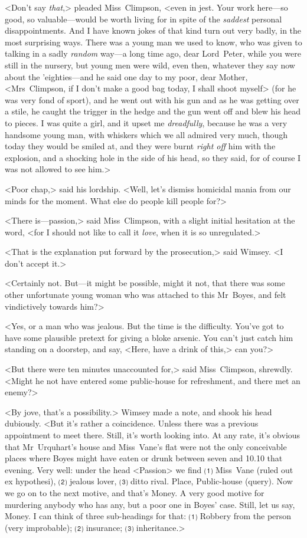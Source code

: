 <Don't say \emph{that},> pleaded Miss~Climpson, <even in jest. Your work here—so good, so valuable—would be worth living for in spite of the \emph{saddest} personal disappointments. And I have known jokes of that kind turn out very badly, in the most surprising ways. There was a young man we used to know, who was given to talking in a sadly \emph{random} way—a long time ago, dear Lord~Peter, while you were still in the nursery, but young men were wild, even then, whatever they say now about the 'eighties—and he said one day to my poor, dear Mother, <Mrs~Climpson, if I don't make a good bag today, I shall shoot myself> (for he was very fond of sport), and he went out with his gun and as he was getting over a stile, he caught the trigger in the hedge and the gun went off and blew his head to pieces. I was quite a girl, and it upset me \emph{dreadfully}, because he was a very handsome young man, with whiskers which we all admired very much, though today they would be smiled at, and they were burnt \emph{right off} him with the explosion, and a shocking hole in the side of his head, so they said, for of course I was not allowed to see him.>

<Poor chap,> said his lordship. <Well, let's dismiss homicidal mania from our minds for the moment. What else do people kill people for?>

<There is—passion,> said Miss~Climpson, with a slight initial hesitation at the word, <for I should not like to call it \emph{love}, when it is so unregulated.>

<That is the explanation put forward by the prosecution,> said Wimsey. <I don't accept it.>

<Certainly not. But—it might be possible, might it not, that there was some other unfortunate young woman who was attached to this Mr~Boyes, and felt vindictively towards him?>

<Yes, or a man who was jealous. But the time is the difficulty. You've got to have some plausible pretext for giving a bloke arsenic. You can't just catch him standing on a doorstep, and say, <Here, have a drink of this,> can you?>

<But there were ten minutes unaccounted for,> said Miss~Climpson, shrewdly. <Might he not have entered some public-house for refreshment, and there met an enemy?>

<By jove, that's a possibility.> Wimsey made a note, and shook his head dubiously. <But it's rather a coincidence. Unless there was a previous appointment to meet there. Still, it's worth looking into. At any rate, it's obvious that Mr~Urquhart's house and Miss~Vane's flat were not the only conceivable places where Boyes might have eaten or drunk between seven and 10.10 that evening. Very well: under the head <Passion> we find ⑴ Miss~Vane (ruled out ex hypothesi), ⑵ jealous lover, ⑶ ditto rival. Place, Public-house (query). Now we go on to the next motive, and that's Money. A very good motive for murdering anybody who has any, but a poor one in Boyes' case. Still, let us say, Money. I can think of three sub-headings for that: ⑴ Robbery from the person (very improbable); ⑵ insurance; ⑶ inheritance.>

